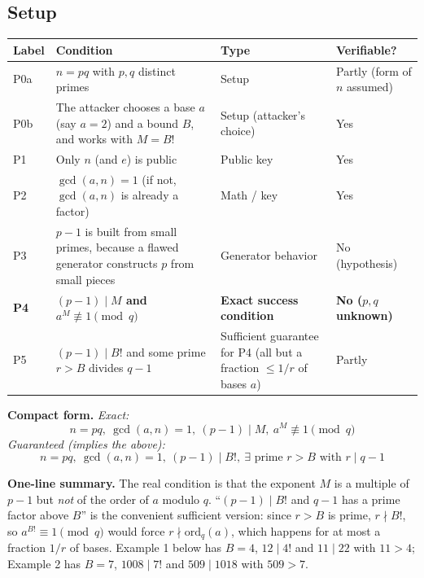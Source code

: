 \documentclass[11pt]{article}
\begin{document}
\subsection*{Setup}
\begin{center}
\begin{tabular}{@{}>{\raggedright\arraybackslash}p{1.1cm}>{\raggedright\arraybackslash}p{7.9cm}>{\raggedright\arraybackslash}p{3.4cm}>{\raggedright\arraybackslash}p{2.6cm}@{}}
\toprule
\textbf{Label} & \textbf{Condition} & \textbf{Type} & \textbf{Verifiable?} \\
\midrule
P0a & $n=pq$ with $p,q$ distinct primes & Setup & Partly (form of $n$ assumed) \\
P0b & The attacker chooses a base $a$ (say $a=2$) and a bound $B$, and works with $M=B!$ & Setup (attacker's choice) & Yes \\
P1 & Only $n$ (and $e$) is public & Public key & Yes \\
P2 & $\gcd(a,n)=1$ (if not, $\gcd(a,n)$ is already a factor) & Math / key & Yes \\
P3 & $p-1$ is built from small primes, because a flawed generator constructs $p$ from small pieces & Generator behavior & No (hypothesis) \\
\textbf{P4} & \textbf{$(p-1)\mid M$ and $a^M\not\equiv1\pmod q$} & \textbf{Exact success condition} & \textbf{No ($p,q$ unknown)} \\
P5 & $(p-1)\mid B!$ and some prime $r>B$ divides $q-1$ & Sufficient guarantee for P4 (all but a fraction $\le1/r$ of bases $a$) & Partly \\
\bottomrule
\end{tabular}
\end{center}

\textbf{Compact form.}
\emph{Exact:}
\[
\boxed{\;n=pq,\ \gcd(a,n)=1,\ (p-1)\mid M,\ a^M\not\equiv1\!\!\pmod q\;}
\]
\emph{Guaranteed (implies the above):}
\[
\boxed{\;n=pq,\ \gcd(a,n)=1,\ (p-1)\mid B!,\ \exists\text{ prime }r>B\text{ with }r\mid q-1\;}
\]

\textbf{One-line summary.} The real condition is that the exponent $M$ is a multiple of $p-1$ but \emph{not} of the order of $a$ modulo $q$. ``$(p-1)\mid B!$ and $q-1$ has a prime factor above $B$'' is the convenient sufficient version: since $r>B$ is prime, $r\nmid B!$, so $a^{B!}\equiv1\pmod q$ would force $r\nmid\mathrm{ord}_q(a)$, which happens for at most a fraction $1/r$ of bases. Example 1 below has $B=4$, $12\mid4!$ and $11\mid22$ with $11>4$; Example 2 has $B=7$, $1008\mid7!$ and $509\mid1018$ with $509>7$.
\end{document}
